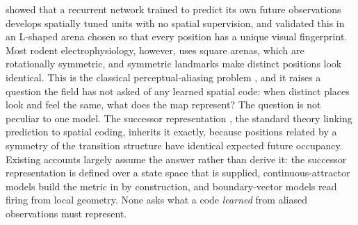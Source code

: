 \documentclass[9pt,lineno]{elife}
\begin{document}
\citet{levenstein2024} showed that a recurrent network trained to predict its own future observations
develops spatially tuned units with no spatial supervision, and validated this in an L-shaped arena
chosen so that every position has a unique visual fingerprint. Most rodent electrophysiology, however,
uses square arenas, which are rotationally symmetric, and symmetric landmarks make distinct positions
look identical. This is the classical perceptual-aliasing problem \citep{whitehead1991}, and it raises
a question the field has not asked of any learned spatial code: when distinct places look and feel the
same, what does the map represent? The question is not peculiar to one model. The successor
representation \citep{stachenfeld2017}, the standard theory linking prediction to spatial coding,
inherits it exactly, because positions related by a symmetry of the transition structure have
identical expected future occupancy. Existing accounts largely assume the answer rather than derive
it: the successor representation is defined over a state space that is supplied, continuous-attractor
models \citep{burak2009} build the metric in by construction, and boundary-vector models
\citep{hartley2000} read firing from local geometry. None asks what a code \emph{learned} from aliased
observations must represent.
\end{document}
